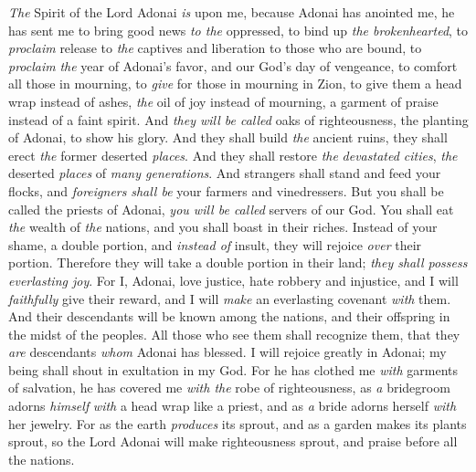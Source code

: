 \begin{biblechapter} %
 \textit{The} Spirit of the Lord Adonai \textit{is} upon me, 
because Adonai has anointed me, 
he has sent me to bring good news \textit{to the} oppressed, 
to bind up \textit{the brokenhearted}, 
to \textit{proclaim} release to \textit{the} captives 
and liberation to those who are bound,
\verse to \textit{proclaim} \textit{the} year of Adonai’s favor, 
and our God’s day of vengeance, 
to comfort all those in mourning,
\verse to \textit{give} for those in mourning in Zion, 
to give them a head wrap instead of ashes, 
\textit{the} oil of joy instead of mourning, 
a garment of praise instead of a faint spirit. 
And \textit{they will be called} oaks of righteousness, 
the planting of Adonai, to show his glory.
\verse And they shall build \textit{the} ancient ruins, 
they shall erect \textit{the} former deserted \textit{places}. 
And they shall restore \textit{the} \textit{devastated cities}, 
\textit{the} deserted \textit{places} of \textit{many generations}.
\verse And strangers shall stand and feed your flocks, 
and \textit{foreigners} \textit{shall be} your farmers and vinedressers.
\verse But you shall be called the priests of Adonai, 
\textit{you will be called} servers of our God. 
You shall eat \textit{the} wealth of \textit{the} nations, 
and you shall boast in their riches.
\verse Instead of your shame, a double portion, 
and \textit{instead of} insult, they will rejoice \textit{over} their portion. 
Therefore they will take a double portion in their land; 
\textit{they shall possess everlasting joy}.
\verse For I, Adonai, love justice, 
hate robbery and injustice, 
and I will \textit{faithfully} give their reward, 
and I will \textit{make} an everlasting covenant \textit{with} them.
\verse And their descendants will be known among the nations, 
and their offspring in the midst of the peoples. 
All those who see them shall recognize them, 
that they \textit{are} descendants \textit{whom} Adonai has blessed.
\verse I will rejoice greatly in Adonai; 
my being shall shout in exultation in my God. 
For he has clothed me \textit{with} garments of salvation, 
he has covered me \textit{with the} robe of righteousness, 
as \textit{a} bridegroom adorns \textit{himself} \textit{with} a head wrap like a priest, 
and as \textit{a} bride adorns herself \textit{with} her jewelry.
\verse For as the earth \textit{produces} its sprout, 
and as a garden makes its plants sprout, 
so the Lord Adonai will make righteousness sprout, 
and praise before all the nations.
\end{biblechapter}

